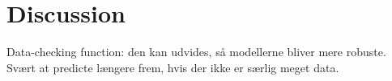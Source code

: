 \chapter{Discussion}

Data-checking function: den kan udvides, så modellerne bliver mere robuste. Svært at predicte længere frem, hvis der ikke er særlig meget data.